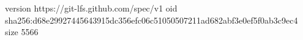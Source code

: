 version https://git-lfs.github.com/spec/v1
oid sha256:d68e29927445643915dc356efc06c51050507211ad682abf3e0ef5f0ab3c9ec4
size 5566
